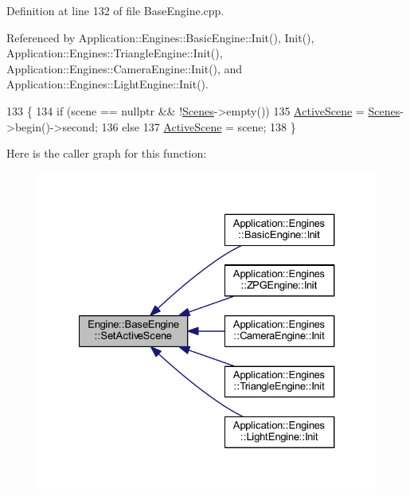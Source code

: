 Definition at line 132 of file Base\+Engine.\+cpp.



Referenced by Application\+::\+Engines\+::\+Basic\+Engine\+::\+Init(), Init(), Application\+::\+Engines\+::\+Triangle\+Engine\+::\+Init(), Application\+::\+Engines\+::\+Camera\+Engine\+::\+Init(), and Application\+::\+Engines\+::\+Light\+Engine\+::\+Init().


\begin{DoxyCode}
133 \{
134     \textcolor{keywordflow}{if} (scene == \textcolor{keyword}{nullptr} && !\mbox{\hyperlink{classEngine_1_1BaseEngine_afd02af3c2fbe9bb734db014dec06585a}{Scenes}}->empty())
135         \mbox{\hyperlink{classEngine_1_1BaseEngine_adb3dbc839da9d821e08b18d8a221698d}{ActiveScene}} = \mbox{\hyperlink{classEngine_1_1BaseEngine_afd02af3c2fbe9bb734db014dec06585a}{Scenes}}->begin()->second;
136     \textcolor{keywordflow}{else}
137         \mbox{\hyperlink{classEngine_1_1BaseEngine_adb3dbc839da9d821e08b18d8a221698d}{ActiveScene}} = scene;     
138 \}
\end{DoxyCode}
Here is the caller graph for this function\+:
\nopagebreak
\begin{figure}[H]
\begin{center}
\leavevmode
\includegraphics[width=327pt]{classEngine_1_1BaseEngine_afc82c6a00d5a9d4714740fc5eab5db86_icgraph}
\end{center}
\end{figure}
\mbox{\label{classEngine_1_1BaseEngine_a525fdc7a1da7eecb514ad5763f06be79}} 

